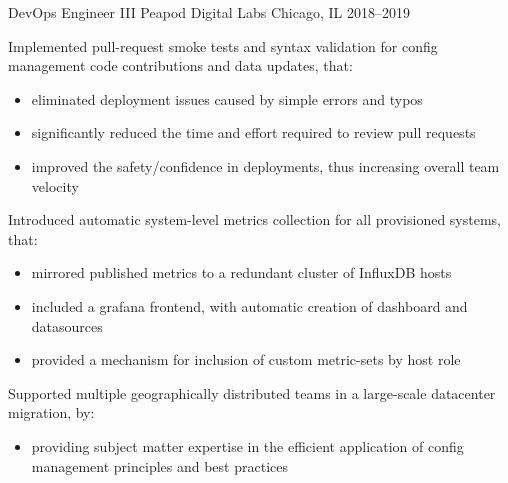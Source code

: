 

\begin{cventries}

  \cventry
    {DevOps Engineer III} %
    {Peapod Digital Labs} %
    {Chicago, IL} %
    {2018--2019} %
    {
      \begin{cvitems} %
        \item {Implemented pull-request smoke tests and syntax validation for config management code contributions and data updates, that:
          \begin{itemize}[leftmargin=*,label={\bullet}]
              \item eliminated deployment issues caused by simple errors and typos
              \item significantly reduced the time and effort required to review pull requests
              \item improved the safety/confidence in deployments, thus increasing overall team velocity
          \end{itemize}
        }
        \item {Introduced automatic system-level metrics collection for all provisioned systems, that:
          \begin{itemize}[leftmargin=*,label={\bullet}]
              \item mirrored published metrics to a redundant cluster of InfluxDB hosts
              \item included a grafana frontend, with automatic creation of dashboard and datasources
              \item provided a mechanism for inclusion of custom metric-sets by host role
          \end{itemize}
        }
        \item {Supported multiple geographically distributed teams in a large-scale datacenter migration, by:
          \begin{itemize}[leftmargin=*,label={\bullet}]
              \item providing subject matter expertise in the efficient application of config management principles and best practices

\end{itemize}}
\end{cvitems}}
\end{cventries}

